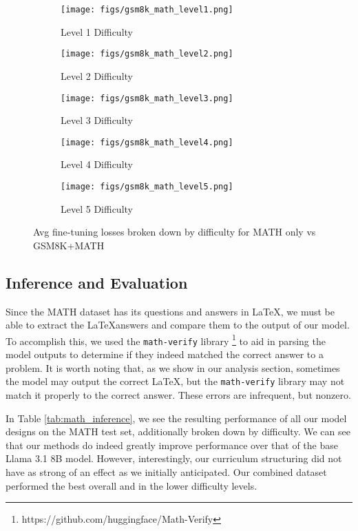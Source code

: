 \begin{figure*}[t]
    \centering
    \begin{subfigure}[]{0.3\textwidth}
        \texttt{[image: figs/gsm8k\_math\_level1.png]}
        \caption{Level 1 Difficulty}
        \label{fig:lvl1}
    \end{subfigure}
    \begin{subfigure}[]{0.3\textwidth}
        \texttt{[image: figs/gsm8k\_math\_level2.png]}
        \caption{Level 2 Difficulty}
        \label{fig:lvl2}
    \end{subfigure}
    \begin{subfigure}[]{0.3\textwidth}
        \texttt{[image: figs/gsm8k\_math\_level3.png]}
        \caption{Level 3 Difficulty}
        \label{fig:lvl3}
    \end{subfigure}
    \begin{subfigure}[]{0.3\textwidth}
        \texttt{[image: figs/gsm8k\_math\_level4.png]}
        \caption{Level 4 Difficulty}
        \label{fig:lvl4}
    \end{subfigure}
    \begin{subfigure}[]{0.3\textwidth}
        \texttt{[image: figs/gsm8k\_math\_level5.png]}
        \caption{Level 5 Difficulty}
        \label{fig:lvl5}
    \end{subfigure}
    \caption{Avg fine-tuning losses broken down by difficulty for MATH only vs GSM8K+MATH}
    \label{fig:leveled}
\end{figure*}

\subsection{Inference and Evaluation}
Since the MATH dataset has its questions and answers in \LaTeX, we must be able to extract the \LaTeX answers and compare them to the output of our model. To accomplish this, we used the \texttt{math-verify} library \footnote{https://github.com/huggingface/Math-Verify} to aid in parsing the model outputs to determine if they indeed matched the correct answer to a problem. It is worth noting that, as we show in our analysis section, sometimes the model may output the correct \LaTeX, but the \texttt{math-verify} library may not match it properly to the correct answer. These errors are infrequent, but nonzero.

In Table \ref{tab:math_inference}, we see the resulting performance of all our model designs on the MATH test set, additionally broken down by difficulty. We can see that our methods do indeed greatly improve performance over that of the base Llama 3.1 8B model. However, interestingly, our curriculum structuring did not have as strong of an effect as we initially anticipated. Our combined dataset performed the best overall and in the lower difficulty levels.